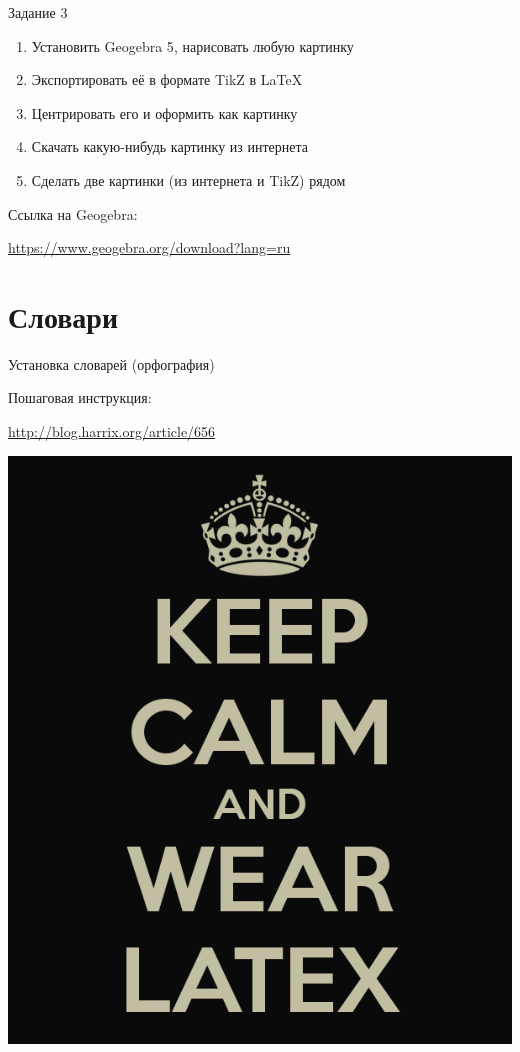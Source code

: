 \documentclass[aspectratio=169]{beamer} %
\begin{document}
\begin{frame}[plain]{Задание 3} 

\begin{enumerate}
	\item  Установить \alert{Geogebra 5}, нарисовать любую картинку
	\item  Экспортировать её в формате TikZ в \LaTeX
	\item  Центрировать его и оформить как картинку
	\item  Скачать какую-нибудь картинку из интернета
	\item  Сделать две картинки (из интернета и TikZ) рядом
\end{enumerate}

\begin{block}{Ссылка на Geogebra:}
	\vspace{3mm}
	\centerline {\url{ https://www.geogebra.org/download?lang=ru }}
	\vspace{3mm}
\end{block}
\end{frame}


\section{Словари} 

 \begin{frame}[plain]{Установка словарей (орфография)}
 
 \begin{block}{Пошаговая инструкция:}
 	\vspace{3mm}
 	\centerline {\url{ http://blog.harrix.org/article/656}}
 	\vspace{3mm}
 \end{block}
\end{frame}


\begingroup
{}
\begin{frame}[plain]
\centering \includegraphics[width=0.55\linewidth]{wearlatex.png}
\end{frame}
\endgroup 
\end{document}
